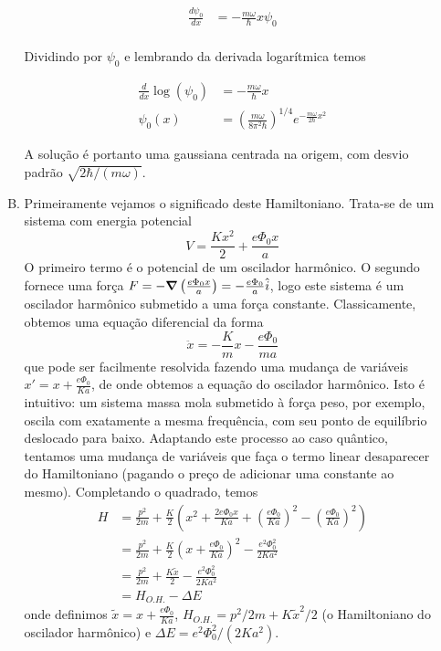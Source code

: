\documentclass[a4paper, 12pt, notitlepage]{article}
\begin{document}
\begin{enumerate}
\begin{enumerate}[(A)]
  \begin{align*}
  \frac{d\psi_0}{dx} &= -\frac{m\omega}{\hbar} x \psi_0 \\
  \end{align*}
  
  Dividindo por $\psi_0$ e lembrando da derivada logarítmica temos
  
  \begin{align*}
  \frac{d}{dx} \log(\psi_0) &= -\frac{m\omega}{\hbar} x \\
  \psi_0(x) &= \left(\frac{m\omega}{8\pi^2\hbar}\right)^{1/4}e^{-\frac{m\omega}{2\hbar} x^2}
  \end{align*}
  
  A solução é portanto uma gaussiana centrada na origem, com desvio padrão $\sqrt{2\hbar/(m\omega)}$. 
  
  \item Primeiramente vejamos o significado deste Hamiltoniano. Trata-se de um sistema com energia potencial
  \begin{equation*}
    V = \frac{Kx^2}{2} + \frac{e\Phi_0 x}{a}
  \end{equation*}
  O primeiro termo é o potencial de um oscilador harmônico. O segundo fornece uma força $F = -\grad\left(\frac{e\Phi_0 x}{a}\right) = -\frac{e\Phi_0}{a} \hat{i}$, logo este sistema é um oscilador harmônico submetido a uma força constante. Classicamente, obtemos uma equação diferencial da forma
  \[
    \ddot{x} = -\frac{K}{m}x - \frac{e\Phi_0}{ma}
  \]
  que pode ser facilmente resolvida fazendo uma mudança de variáveis $x' = x + \frac{e\Phi_0}{Ka}$, de onde obtemos a equação do oscilador harmônico. Isto é intuitivo: um sistema massa mola submetido à força peso, por exemplo, oscila com exatamente a mesma frequência, com seu ponto de equilíbrio deslocado para baixo.
  Adaptando este processo ao caso quântico, tentamos uma mudança de variáveis que faça o termo linear desaparecer do Hamiltoniano (pagando o preço de adicionar uma constante ao mesmo). Completando o quadrado, temos
  \begin{align*}
    H &= \frac{p^2}{2m} + \frac{K}{2}\left(x^2 + \frac{2e\Phi_0x}{Ka} + \left(\frac{e\Phi_0}{Ka}\right)^2 - \left(\frac{e\Phi_0}{Ka}\right)^2\right) \\
    &= \frac{p^2}{2m} + \frac{K}{2}\left(x + \frac{e\Phi_0}{Ka}\right)^2 - \frac{e^2 \Phi_0^2}{2Ka^2} \\
    &= \frac{p^2}{2m} + \frac{K\tilde{x}}{2} - \frac{e^2 \Phi_0^2}{2Ka^2} \\
    &= H_{O.H.} - \Delta E
  \end{align*}
  \noindent onde definimos $\tilde{x} = x + \frac{e\Phi_0}{Ka}$, $H_{O.H.} = p^2/2m + K\tilde{x}^2/2$ (o Hamiltoniano do oscilador harmônico) e $\Delta E = e^2 \Phi_0^2/(2Ka^2)$.
  

\end{enumerate}
\end{enumerate}
\end{document}
